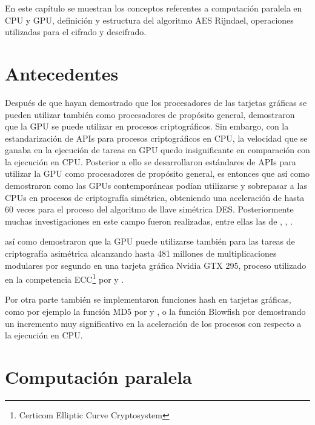 \documentclass[../main/main.tex]{subfiles}
\begin{document}
\espacio
  En este capítulo se muestran los conceptos referentes a computación paralela en CPU y GPU, definición y estructura del algoritmo AES Rijndael, operaciones utilizadas para el cifrado y descifrado.

  \section{Antecedentes}

  Después de que \cite{thesis:two_hash_cuda} hayan demostrado que los procesadores de las tarjetas gráficas se pueden utilizar también como procesadores de propósito general, \cite{article:secret_key_gpu} demostraron que la GPU se puede utilizar en procesos criptográficos. Sin embargo, con la estandarización de APIs para procesos criptográficos en CPU, la velocidad que se ganaba en la ejecución de tareas en GPU quedo insignificante en comparación con la ejecución en CPU. Posterior a ello se desarrollaron estándares de APIs para utilizar la GPU como procesadores de propósito general, es entonces que \cite{article:symmetric_key_gpu} así como \cite{article:practical_symmetric_key_gpu} demostraron como las GPUs contemporáneas podían utilizarse y sobrepasar a las CPUs en procesos de criptografía simétrica, obteniendo una aceleración de hasta 60 veces para el proceso del algoritmo de llave simétrica DES. Posteriormente muchas investigaciones en este campo fueron realizadas, entre ellas las de \cite{article:cuda_aes_hardware_accelerator}, \cite{article:encryption_commodity_gpu}, \cite{article:design_parallel_aes_cuda}.
  
  \cite{article:exploiting_gpu_asymmetric_cryptography} así como \cite{article:efficient_cryptography_gpu} demostraron que la GPU puede utilizarse también para las tareas de criptografía asimétrica alcanzando hasta 481 millones de multiplicaciones modulares por segundo en una tarjeta gráfica Nvidia GTX 295, proceso utilizado en la competencia ECC\footnote{Certicom Elliptic Curve Cryptosystem} por \cite{report:ecm_on_gpu} y \cite{report:2k_130_on_nvidia}.

  Por otra parte también se implementaron funciones hash en tarjetas gráficas, como por ejemplo la función MD5 por \cite{report:throughput_md5_gpu} y \cite{article:md5_rc4_gpu_cuda}, o la función Blowfish por \cite{report:new_speed_time_encryption_gpu} demostrando un incremento muy significativo en la aceleración de los procesos con respecto a la ejecución en CPU.

  \section{Computación paralela}
\end{document}
